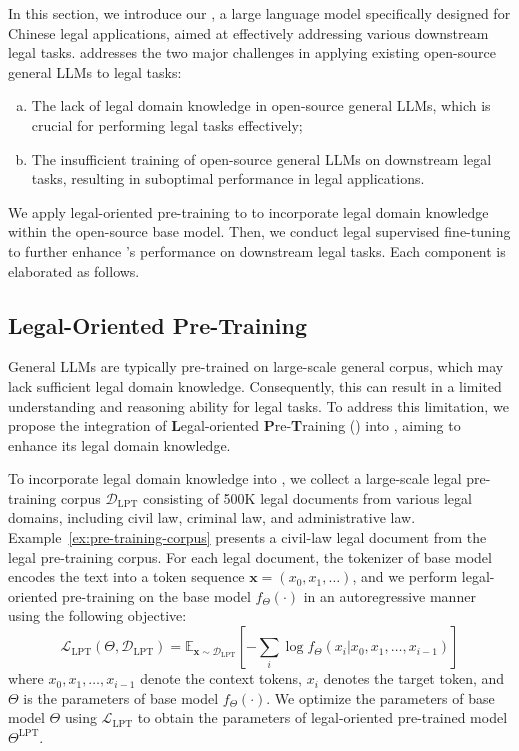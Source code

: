 In this section, we introduce our \algo, a large language model specifically designed for Chinese legal applications, aimed at effectively addressing various downstream legal tasks. 
\algo addresses the two major challenges in applying existing open-source general LLMs to legal tasks:
\begin{enumerate}[(a)]
    \item The lack of legal domain knowledge in open-source general LLMs, which is crucial for performing legal tasks effectively;
    \item The insufficient training of open-source general LLMs on downstream legal tasks, resulting in suboptimal performance in legal applications.
\end{enumerate}
We apply legal-oriented pre-training to \algo to incorporate legal domain knowledge within the open-source base model. 
Then, we conduct legal supervised fine-tuning to further enhance \algo's performance on downstream legal tasks.
Each component is elaborated as follows. %

\subsection{Legal-Oriented Pre-Training}

General LLMs are typically pre-trained on large-scale general corpus, which may lack sufficient legal domain knowledge. Consequently, this can result in a limited understanding and reasoning ability for legal tasks. To address this limitation, we propose the integration of \textbf{L}egal-oriented \textbf{P}re-\textbf{T}raining ()  into \algo, aiming to enhance its legal domain knowledge.

To incorporate legal domain knowledge into \algo, we collect a large-scale legal pre-training corpus $\mathcal{D}_{\text{LPT}}$ consisting of 500K legal documents from various legal domains, including civil law, criminal law, and administrative law. 
Example~\ref{ex:pre-training-corpus} presents a civil-law legal document from the legal pre-training corpus. For each legal document, the tokenizer of base model encodes the text into a token sequence $\boldsymbol{x}=(x_0, x_1, \ldots)$, and we perform legal-oriented pre-training on the base model $f_{\Theta}(\cdot)$ in an autoregressive manner using the following objective:
\begin{equation}
\mathcal{L}_{\text{LPT}}(\Theta, \mathcal{D}_{\text{LPT}}) = \mathbb{E}_{\boldsymbol{x} \sim \mathcal{D}_{\text{LPT}}}\left[ -\sum\limits_{i} \log{f_{\Theta}(x_i|x_0, x_1, \ldots, x_{i-1})}\right]
\end{equation}
where $x_0, x_1, \ldots, x_{i-1}$ denote the context tokens, $x_i$ denotes the target token, and $\Theta$ is the parameters of base model $f_{\Theta}(\cdot)$. 
We optimize the parameters of base model $\Theta$ using $\mathcal{L}_{\text{LPT}}$ to obtain the parameters of legal-oriented pre-trained model $\Theta^{\text{LPT}}$.

